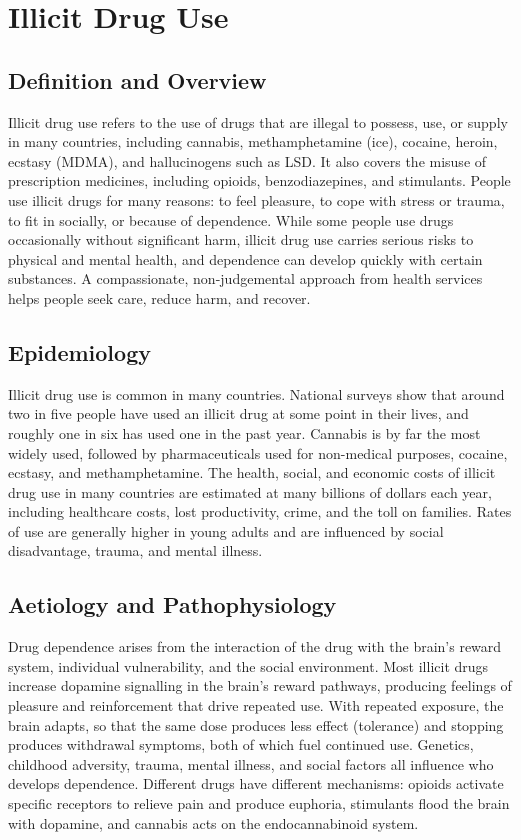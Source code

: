 \chapter{Illicit Drug Use}

\section*{Definition and Overview}
Illicit drug use refers to the use of drugs that are illegal to possess, use, or supply in many countries, including cannabis, methamphetamine (ice), cocaine, heroin, ecstasy (MDMA), and hallucinogens such as LSD. It also covers the misuse of prescription medicines, including opioids, benzodiazepines, and stimulants. People use illicit drugs for many reasons: to feel pleasure, to cope with stress or trauma, to fit in socially, or because of dependence. While some people use drugs occasionally without significant harm, illicit drug use carries serious risks to physical and mental health, and dependence can develop quickly with certain substances. A compassionate, non-judgemental approach from health services helps people seek care, reduce harm, and recover.

\section*{Epidemiology}
Illicit drug use is common in many countries. National surveys show that around two in five people have used an illicit drug at some point in their lives, and roughly one in six has used one in the past year. Cannabis is by far the most widely used, followed by pharmaceuticals used for non-medical purposes, cocaine, ecstasy, and methamphetamine. The health, social, and economic costs of illicit drug use in many countries are estimated at many billions of dollars each year, including healthcare costs, lost productivity, crime, and the toll on families. Rates of use are generally higher in young adults and are influenced by social disadvantage, trauma, and mental illness.

\section*{Aetiology and Pathophysiology}
Drug dependence arises from the interaction of the drug with the brain's reward system, individual vulnerability, and the social environment. Most illicit drugs increase dopamine signalling in the brain's reward pathways, producing feelings of pleasure and reinforcement that drive repeated use. With repeated exposure, the brain adapts, so that the same dose produces less effect (tolerance) and stopping produces withdrawal symptoms, both of which fuel continued use. Genetics, childhood adversity, trauma, mental illness, and social factors all influence who develops dependence. Different drugs have different mechanisms: opioids activate specific receptors to relieve pain and produce euphoria, stimulants flood the brain with dopamine, and cannabis acts on the endocannabinoid system.

